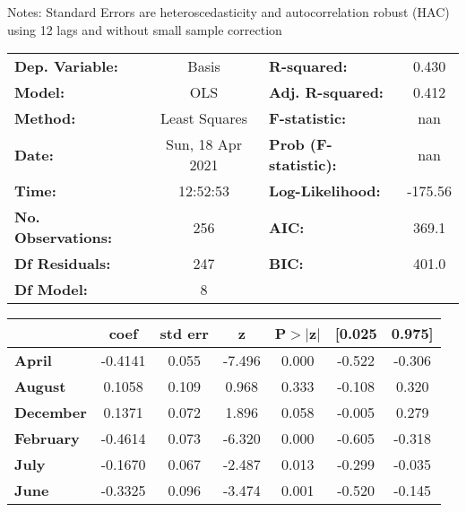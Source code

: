 Notes: \newline
 [1] Standard Errors are heteroscedasticity and autocorrelation robust (HAC) using 12 lags and without small sample correction
\begin{center}
\begin{tabular}{lclc}
\toprule
\textbf{Dep. Variable:}    &      Basis       & \textbf{  R-squared:         } &     0.430   \\
\textbf{Model:}            &       OLS        & \textbf{  Adj. R-squared:    } &     0.412   \\
\textbf{Method:}           &  Least Squares   & \textbf{  F-statistic:       } &       nan   \\
\textbf{Date:}             & Sun, 18 Apr 2021 & \textbf{  Prob (F-statistic):} &      nan    \\
\textbf{Time:}             &     12:52:53     & \textbf{  Log-Likelihood:    } &   -175.56   \\
\textbf{No. Observations:} &         256      & \textbf{  AIC:               } &     369.1   \\
\textbf{Df Residuals:}     &         247      & \textbf{  BIC:               } &     401.0   \\
\textbf{Df Model:}         &           8      & \textbf{                     } &             \\
\bottomrule
\end{tabular}
\begin{tabular}{lcccccc}
                  & \textbf{coef} & \textbf{std err} & \textbf{z} & \textbf{P$> |$z$|$} & \textbf{[0.025} & \textbf{0.975]}  \\
\midrule
\textbf{April}    &      -0.4141  &        0.055     &    -7.496  &         0.000        &       -0.522    &       -0.306     \\
\textbf{August}   &       0.1058  &        0.109     &     0.968  &         0.333        &       -0.108    &        0.320     \\
\textbf{December} &       0.1371  &        0.072     &     1.896  &         0.058        &       -0.005    &        0.279     \\
\textbf{February} &      -0.4614  &        0.073     &    -6.320  &         0.000        &       -0.605    &       -0.318     \\
\textbf{July}     &      -0.1670  &        0.067     &    -2.487  &         0.013        &       -0.299    &       -0.035     \\
\textbf{June}     &      -0.3325  &        0.096     &    -3.474  &         0.001        &       -0.520    &       -0.145     \\

\end{tabular}
\end{center}
